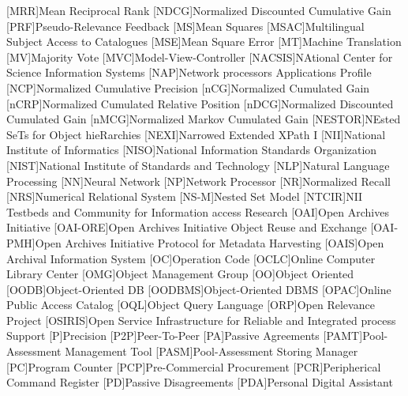 [MRR]{Mean Reciprocal Rank}
[NDCG]{Normalized Discounted Cumulative Gain}
[PRF]{Pseudo-Relevance Feedback}
[MS]{Mean Squares}
[MSAC]{Multilingual Subject Access to Catalogues}
[MSE]{Mean Square Error}
[MT]{Machine Translation}
[MV]{Majority Vote}
[MVC]{Model-View-Controller}
[NACSIS]{NAtional Center for Science Information Systems}
[NAP]{Network processors Applications Profile}
[NCP]{Normalized Cumulative Precision}
[nCG]{Normalized Cumulated Gain}
[nCRP]{Normalized Cumulated Relative Position}
[nDCG]{Normalized Discounted Cumulated Gain}
[nMCG]{Normalized Markov Cumulated Gain}
[NESTOR]{NEsted SeTs for Object hieRarchies}
[NEXI]{Narrowed Extended XPath I}
[NII]{National Institute of Informatics}
[NISO]{National Information Standards Organization}
[NIST]{National Institute of Standards and Technology}
[NLP]{Natural Language Processing}
[NN]{Neural Network}
[NP]{Network Processor}
[NR]{Normalized Recall}
[NRS]{Numerical Relational System}
[NS-M]{Nested Set Model}
[NTCIR]{NII Testbeds and Community for Information access Research}
[OAI]{Open Archives Initiative}
[OAI-ORE]{Open Archives Initiative Object Reuse and Exchange}
[OAI-PMH]{Open Archives Initiative Protocol for Metadata Harvesting}
[OAIS]{Open Archival Information System}
[OC]{Operation Code}
[OCLC]{Online Computer Library Center}
[OMG]{Object Management Group}
[OO]{Object Oriented}
[OODB]{Object-Oriented \acs{DB}}
[OODBMS]{Object-Oriented \acs{DBMS}}
[OPAC]{Online Public Access Catalog}
[OQL]{Object Query Language}
[ORP]{Open Relevance Project}
[OSIRIS]{Open Service Infrastructure for Reliable and Integrated process Support}
[P]{Precision}
[P2P]{Peer-To-Peer}
[PA]{Passive Agreements}
[PAMT]{Pool-Assessment Management Tool}
[PASM]{Pool-Assessment Storing Manager}
[PC]{Program Counter}
[PCP]{Pre-Commercial Procurement}
[PCR]{Peripherical Command Register}
[PD]{Passive Disagreements}
[PDA]{Personal Digital Assistant}
